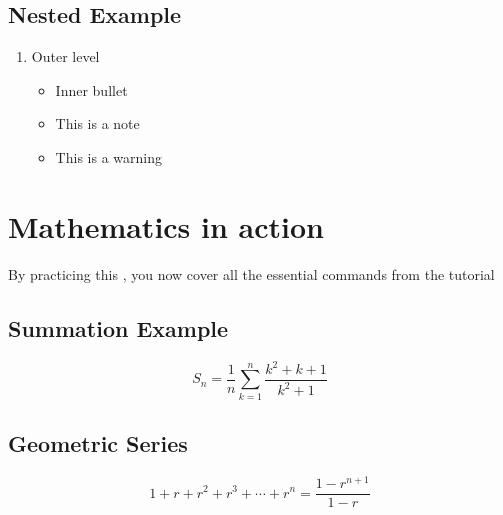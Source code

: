 \documentclass{article}
\begin{document}
	\subsection{Nested Example}
	\begin{enumerate}
		\item Outer level
		\begin{itemize}
			\item Inner bullet
			\item[Note:] This is a note
			\item[Wait!] This is a warning 
		\end{itemize}
	\end{enumerate}
	\section{Mathematics in action}
	By practicing this , you now cover all the essential commands from the tutorial
	\subsection{Summation Example}
	\[
		S_n=\frac{1}{n} \sum_{k=1}^{n} \frac{k^2+k+1}{k^2+1}
	\] 
	\subsection{Geometric Series}
	\[
		1+r+r^2+r^3+\cdots+r^n  = \frac{1-r^{n+1}}{1-r}
	\]
\end{document}
